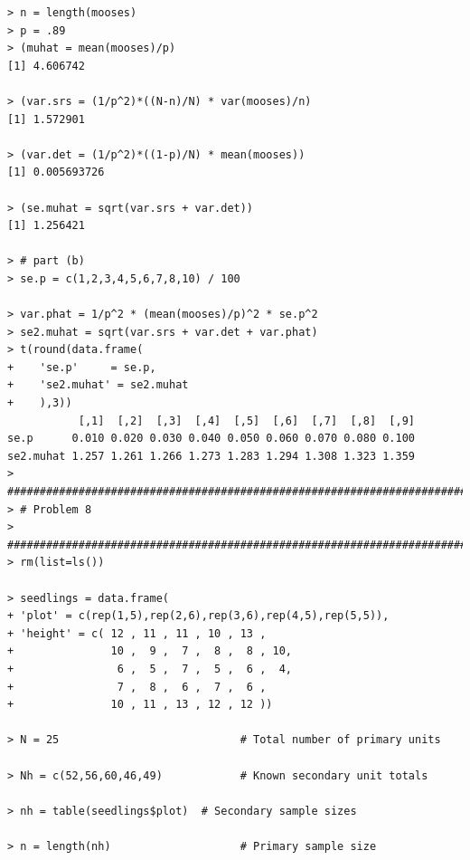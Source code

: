 \documentclass[usenames,dvipsnames]{homework}
\begin{document}
\begin{lstlisting}
> n = length(mooses) 
> p = .89 
> (muhat = mean(mooses)/p)
[1] 4.606742

> (var.srs = (1/p^2)*((N-n)/N) * var(mooses)/n)
[1] 1.572901

> (var.det = (1/p^2)*((1-p)/N) * mean(mooses))
[1] 0.005693726

> (se.muhat = sqrt(var.srs + var.det))
[1] 1.256421

> # part (b)
> se.p = c(1,2,3,4,5,6,7,8,10) / 100 

> var.phat = 1/p^2 * (mean(mooses)/p)^2 * se.p^2 
> se2.muhat = sqrt(var.srs + var.det + var.phat) 
> t(round(data.frame(
+    'se.p'     = se.p,
+    'se2.muhat' = se2.muhat
+    ),3))
           [,1]  [,2]  [,3]  [,4]  [,5]  [,6]  [,7]  [,8]  [,9]
se.p      0.010 0.020 0.030 0.040 0.050 0.060 0.070 0.080 0.100
se2.muhat 1.257 1.261 1.266 1.273 1.283 1.294 1.308 1.323 1.359
> ################################################################################
> # Problem 8
> ################################################################################
> rm(list=ls()) 

> seedlings = data.frame(
+ 'plot' = c(rep(1,5),rep(2,6),rep(3,6),rep(4,5),rep(5,5)),
+ 'height' = c( 12 , 11 , 11 , 10 , 13 ,    
+               10 ,  9 ,  7 ,  8 ,  8 , 10,
+                6 ,  5 ,  7 ,  5 ,  6 ,  4,
+                7 ,  8 ,  6 ,  7 ,  6 ,   
+               10 , 11 , 13 , 12 , 12 ))   

> N = 25                            # Total number of primary units

> Nh = c(52,56,60,46,49)            # Known secondary unit totals

> nh = table(seedlings$plot)  # Secondary sample sizes

> n = length(nh)                    # Primary sample size


\end{lstlisting}
\end{document}
